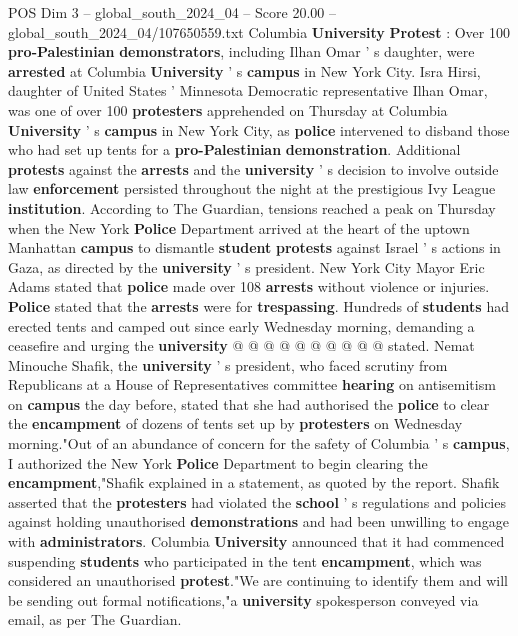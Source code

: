 \begin{textsample}{POS Dim 3 – global\_south\_2024\_04 – Score 20.00 – global\_south\_2024\_04/107650559.txt}  \label{ex:f3_pos_215}
Columbia \textbf{University} \textbf{Protest} : Over 100 \textbf{pro-Palestinian} \textbf{demonstrators}, including Ilhan Omar ' s daughter, were \textbf{arrested} at Columbia \textbf{University} ' s \textbf{campus} in New York City.
Isra Hirsi, daughter of United States ' Minnesota Democratic representative Ilhan Omar, was one of over 100 \textbf{protesters} apprehended on Thursday at Columbia \textbf{University} ' s \textbf{campus} in New York City, as \textbf{police} intervened to disband those who had set up tents for a \textbf{pro-Palestinian} \textbf{demonstration}.
Additional \textbf{protests} against the \textbf{arrests} and the \textbf{university} ' s decision to involve outside law \textbf{enforcement} persisted throughout the night at the prestigious Ivy League \textbf{institution}.
According to The Guardian, tensions reached a peak on Thursday when the New York \textbf{Police} Department arrived at the heart of the uptown Manhattan \textbf{campus} to dismantle \textbf{student} \textbf{protests} against Israel ' s actions in Gaza, as directed by the \textbf{university} ' s president.
New York City Mayor Eric Adams stated that \textbf{police} made over 108 \textbf{arrests} without violence or injuries. \textbf{Police} stated that the \textbf{arrests} were for \textbf{trespassing}.
Hundreds of \textbf{students} had erected tents and camped out since early Wednesday morning, demanding a ceasefire and urging the \textbf{university} @ @ @ @ @ @ @ @ @ @ stated.
Nemat Minouche Shafik, the \textbf{university} ' s president, who faced scrutiny from Republicans at a House of Representatives committee \textbf{hearing} on antisemitism on \textbf{campus} the day before, stated that she had authorised the \textbf{police} to clear the \textbf{encampment} of dozens of tents set up by \textbf{protesters} on Wednesday morning."Out of an abundance of concern for the safety of Columbia ' s \textbf{campus}, I authorized the New York \textbf{Police} Department to begin clearing the \textbf{encampment},"Shafik explained in a statement, as quoted by the report.
Shafik asserted that the \textbf{protesters} had violated the \textbf{school} ' s regulations and policies against holding unauthorised \textbf{demonstrations} and had been unwilling to engage with \textbf{administrators}.
Columbia \textbf{University} announced that it had commenced suspending \textbf{students} who participated in the tent \textbf{encampment}, which was considered an unauthorised \textbf{protest}."We are continuing to identify them and will be sending out formal notifications,"a \textbf{university} spokesperson conveyed via email, as per The Guardian.

\end{textsample}
